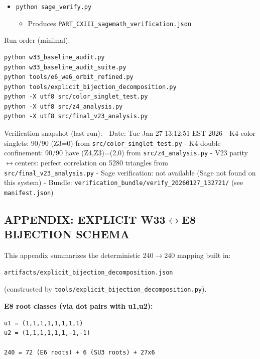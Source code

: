 \documentclass[11pt]{article}
\providecommand{\tightlist}{%
  \setlength{\itemsep}{0pt}\setlength{\parskip}{0pt}}
\begin{document}
\begin{itemize}
\tightlist
\item
  \texttt{python\ sage\_verify.py}

  \begin{itemize}
  \tightlist
  \item
    Produces \texttt{PART\_CXIII\_sagemath\_verification.json}
  \end{itemize}
\end{itemize}

Run order (minimal):

\begin{verbatim}
python w33_baseline_audit.py
python w33_baseline_audit_suite.py
python tools/e6_we6_orbit_refined.py
python tools/explicit_bijection_decomposition.py
python -X utf8 src/color_singlet_test.py
python -X utf8 src/z4_analysis.py
python -X utf8 src/final_v23_analysis.py
\end{verbatim}

Verification snapshot (last run): - Date: Tue Jan 27 13:12:51 EST 2026 -
K4 color singlets: 90/90 (Z3=0) from
\texttt{src/color\_singlet\_test.py} - K4 double confinement: 90/90 have
(Z4,Z3)=(2,0) from \texttt{src/z4\_analysis.py} - V23
parity\ensuremath{\leftrightarrow}centers: perfect correlation on 5280
triangles from \texttt{src/final\_v23\_analysis.py} - Sage verification:
not available (Sage not found on this system) - Bundle:
\texttt{verification\_bundle/verify\_20260127\_132721/} (see
\texttt{manifest.json})

\subsection{\texorpdfstring{APPENDIX: EXPLICIT
W33\ensuremath{\leftrightarrow}E8 BIJECTION
SCHEMA}{APPENDIX: EXPLICIT W33E8 BIJECTION SCHEMA}}\label{appendix-explicit-w33e8-bijection-schema}

This appendix summarizes the deterministic
240\ensuremath{\rightarrow}240 mapping built in:

\begin{verbatim}
artifacts/explicit_bijection_decomposition.json
\end{verbatim}

(constructed by \texttt{tools/explicit\_bijection\_decomposition.py}).

\textbf{E8 root classes (via dot pairs with u1,u2):}

\begin{verbatim}
u1 = (1,1,1,1,1,1,1,1)
u2 = (1,1,1,1,1,1,-1,-1)

240 = 72 (E6 roots) + 6 (SU3 roots) + 27x6
\end{verbatim}
\end{document}
